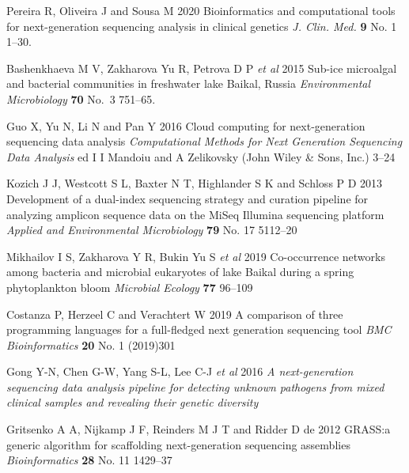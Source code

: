 \documentclass[a4paper]{jpconf}
\renewcommand{\doi}[1]{} %
\begin{document}
\begin{thebibliography}{0}

 Pereira R, Oliveira J and Sousa M 2020 Bioinformatics and computational tools for next-generation sequencing analysis in clinical genetics \emph{J. Clin. Med.} \textbf{9}  No. 1 1--30. \doi{10.3390/jcm9010132}

 Bashenkhaeva M V, Zakharova Yu R, Petrova D P \emph{et al} 2015 Sub-ice microalgal and bacterial communities in freshwater lake Baikal, Russia \emph{Environmental Microbiology} \textbf{70} No.~3 751--65. \doi{10.1007/s00248-015-0619-2}

 Guo X, Yu N, Li N and Pan Y 2016 Cloud computing for next-generation sequencing data analysis \emph{Computational Methods for Next Generation Sequencing Data Analysis} ed I I Mandoiu and  A Zelikovsky (John Wiley \& Sons, Inc.) 3--24

 Kozich J J, Westcott S L, Baxter N T, Highlander S K and Schloss P D 2013 Development of a dual-index sequencing strategy and curation pipeline for analyzing amplicon sequence data on the MiSeq Illumina sequencing platform \emph{Applied and Environmental Microbiology} \textbf{79} No. 17 5112--20 \doi{10.1128/AEM.01043-13}

 Mikhailov I S, Zakharova Y R, Bukin Yu S \emph{et al} 2019 Co-occurrence networks among bacteria and microbial eukaryotes of lake Baikal during a spring phytoplankton bloom \emph{Microbial Ecology} \textbf{77} 96--109 \doi{10.1007/s00248-018-1212-2} %


 Costanza P, Herzeel C and Verachtert W 2019 A comparison of three
 programming languages for a full-fledged next generation sequencing tool \emph{BMC Bioinformatics} \textbf{20} No. 1 (2019)301 \doi{10.1186/s12859-019-2903-5}

 Gong Y-N, Chen G-W, Yang S-L, Lee C-J \emph{et al} 2016 \emph{A next-generation sequencing data analysis pipeline for detecting unknown pathogens from mixed clinical samples and revealing their genetic diversity} \doi{10.1371/journal.pone.0151495}

 Gritsenko A A, Nijkamp J F, Reinders M J T and Ridder D de 2012 GRASS:\@ a generic algorithm for scaffolding next-generation sequencing assemblies \emph{Bioinformatics} \textbf{28} No. 11  1429--37 \doi{10.1093/bioinformatics/bts175}


\end{thebibliography}
\end{document}

